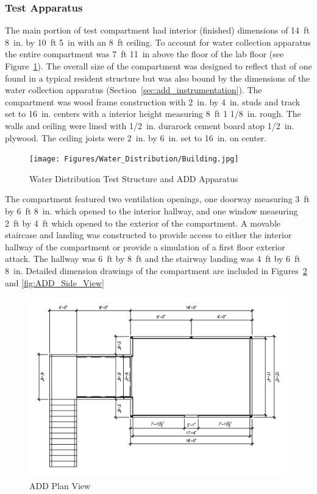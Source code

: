 \documentclass{article}
\begin{document}
\subsubsection{Test Apparatus}
\label{ADD_discussion}
The main portion of test compartment had interior (finished) dimensions of 14~ft 8~in. by 10~ft 5~in with an 8~ft ceiling. To account for water collection apparatus the entire compartment was 7~ft 11~in above the floor of the lab floor (see Figure~\ref{fig:Water_Distribution_Test_Structure_and_ADD_Apparatus}). The overall size of the compartment was designed to reflect that of one found in a typical resident structure but was also bound by the dimensions of the water collection apparatus (Section~\ref{sec:add_instrumentation}). The compartment was wood frame construction with 2~in. by 4~in. studs and track set to 16~in. centers with a interior height measuring 8~ft 1 1/8~in. rough. The walls and ceiling were lined with 1/2~in. durarock cement board atop 1/2~in. plywood. The ceiling joists were 2~in. by 6~in. set to 16~in. on center.

\begin{figure}[!ht]
	\centering
	\texttt{[image: Figures/Water\_Distribution/Building.jpg]}
	\caption{Water Distribution Test Structure and ADD Apparatus}
	\label{fig:Water_Distribution_Test_Structure_and_ADD_Apparatus}
\end{figure}

The compartment featured two ventilation openings, one doorway measuring 3~ft by 6~ft 8~in. which opened to the interior hallway, and one window measuring 2~ft by 4~ft which opened to the exterior of the compartment. A movable staircase and landing was constructed to provide access to either the interior hallway of the compartment or provide a simulation of a first floor exterior attack. The hallway was 6~ft by 8~ft and the stairway landing was 4~ft by 6~ft 8~in. Detailed dimension drawings of the compartment are included in Figures~\ref{fig:ADD_Top_View} and \ref{fig:ADD_Side_View}

\begin{figure}[!ht]
	\centering
	\includegraphics[width=\columnwidth]{Figures/Water_Distribution/ADDtopviewprint}
	\caption{ADD Plan View}
	\label{fig:ADD_Top_View}
\end{figure}
\end{document}
